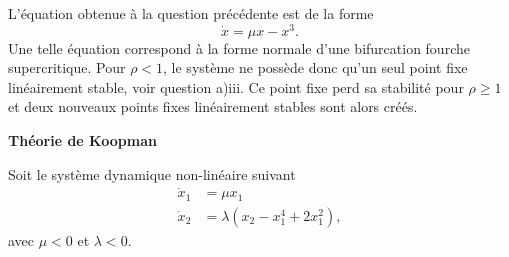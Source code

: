 \documentclass[12pt, answers]{exam}
\begin{document}
\begin{questions}
\begin{parts}
\begin{subparts}
      \begin{solution}
        {\color{blue}
        L'équation obtenue à la question précédente est de la forme
        $$
        \dot{x} = \mu x - x^3.
        $$
        Une telle équation correspond à la forme normale d'une bifurcation fourche supercritique. Pour $\rho < 1$, le système ne possède donc qu'un seul point fixe linéairement stable, voir question a)iii. Ce point fixe perd sa stabilité pour $\rho \geq 1$ et deux nouveaux points fixes linéairement stables sont alors créés.
        }
      \end{solution}

    \end{subparts}
  \end{parts}

  \bigskip

  \addpoints
  \question[10] \textbf{Théorie de Koopman}

  \medskip

  Soit le système dynamique non-linéaire suivant
  \begin{equation}
    \begin{aligned}
      \dot{x}_1 & = \mu x_1 \\
      \dot{x}_2 & = \lambda \left( x_2 - x_1^4 + 2 x_1^2 \right),
    \end{aligned}
    \label{eq: exercise 1}
  \end{equation}
  avec $\mu < 0$ et $\lambda < 0$.


\end{questions}
\end{document}
